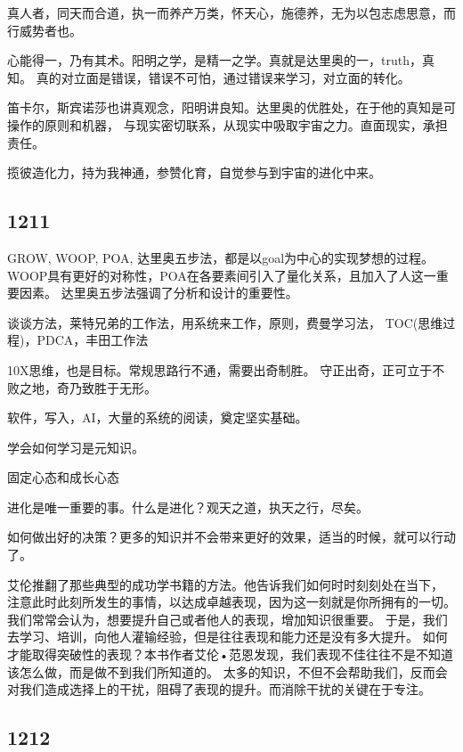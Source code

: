 真人者，同天而合道，执一而养产万类，怀天心，施德养，无为以包志虑思意，而行威势者也。

心能得一，乃有其术。阳明之学，是精一之学。真就是达里奥的一，truth，真知。
真的对立面是错误，错误不可怕，通过错误来学习，对立面的转化。

笛卡尔，斯宾诺莎也讲真观念，阳明讲良知。达里奥的优胜处，在于他的真知是可操作的原则和机器，
与现实密切联系，从现实中吸取宇宙之力。直面现实，承担责任。

揽彼造化力，持为我神通，参赞化育，自觉参与到宇宙的进化中来。

\subsection{1211}

GROW, WOOP, POA, 达里奥五步法，都是以goal为中心的实现梦想的过程。
WOOP具有更好的对称性，POA在各要素间引入了量化关系，且加入了人这一重要因素。
达里奥五步法强调了分析和设计的重要性。

谈谈方法，莱特兄弟的工作法，用系统来工作，原则，费曼学习法，
TOC(思维过程)，PDCA，丰田工作法

10X思维，也是目标。常规思路行不通，需要出奇制胜。
守正出奇，正可立于不败之地，奇乃致胜于无形。

软件，写入，AI，大量的系统的阅读，奠定坚实基础。

学会如何学习是元知识。

固定心态和成长心态

进化是唯一重要的事。什么是进化？观天之道，执天之行，尽矣。

如何做出好的决策？更多的知识并不会带来更好的效果，适当的时候，就可以行动了。

\begin{tcolorbox}
艾伦推翻了那些典型的成功学书籍的方法。他告诉我们如何时时刻刻处在当下，
注意此时此刻所发生的事情，以达成卓越表现，因为这一刻就是你所拥有的一切。
我们常常会认为，想要提升自己或者他人的表现，增加知识很重要。
于是，我们去学习、培训，向他人灌输经验，但是往往表现和能力还是没有多大提升。
如何才能取得突破性的表现？本书作者艾伦•范恩发现，我们表现不佳往往不是不知道该怎么做，而是做不到我们所知道的。
太多的知识，不但不会帮助我们，反而会对我们造成选择上的干扰，阻碍了表现的提升。而消除干扰的关键在于专注。
\end{tcolorbox}

\subsection{1212}

